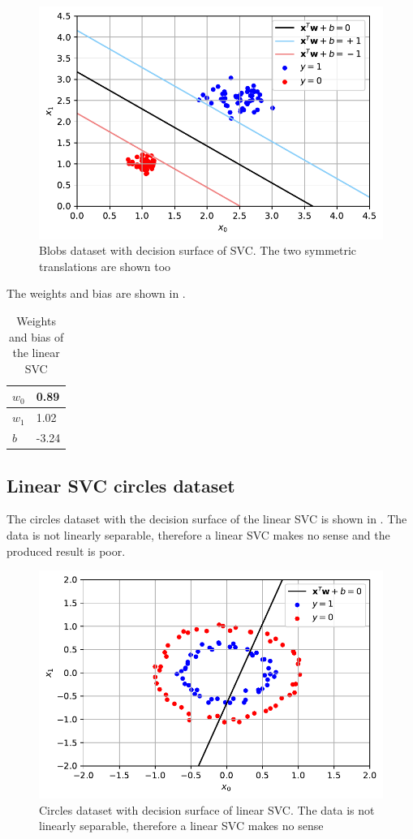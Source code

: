 \documentclass[12pt,a4paper]{scrartcl}
\begin{document}
	\begin{figure}[H]
		\centering	\includegraphics[width=0.85\linewidth]{figs/ex2_2_blob_boundary.pdf}
		\caption{Blobs dataset with decision surface of SVC. The two symmetric translations are shown too}
		\label{fig:ex2_2_blobs}
	\end{figure}

	The weights and bias are shown in .
	\begin{table}[H]
		\centering
		\begin{tabular}{|l|l|}
			\hline
			$w_0$ & 0.89  \\ \hline
			$w_1$ & 1.02 \\ \hline
			$b$ & -3.24 \\ \hline
		\end{tabular}
		\caption{Weights and bias of the linear SVC}
		\label{tab:ex2_2_blobs_weights}
	\end{table}
	
	\subsection*{Linear SVC circles dataset}
	
	The circles dataset with the decision surface of the linear SVC is shown in . The data is not linearly separable, therefore a linear SVC makes no sense and the produced result is poor.
	
	\begin{figure}[H]
		\centering	\includegraphics[width=0.85\linewidth]{figs/ex2_2_circ_boundary.pdf}
		\caption{Circles dataset with decision surface of linear SVC. The data is not linearly separable, therefore a linear SVC makes no sense}
		\label{fig:ex2_2_circles_lin}
	\end{figure}
	
\end{document}
